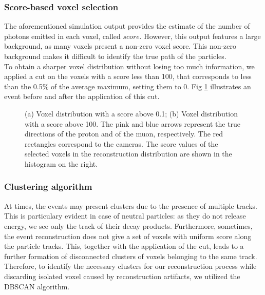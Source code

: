\subsubsection{Score-based voxel selection}
The aforementioned simulation output provides the estimate of the number of photons emitted in each voxel, called $score$. However, this output features a large background, as many voxels present a non-zero voxel score.
This non-zero background makes it difficult to identify the true path of the particles. \\ To obtain a sharper voxel distribution without losing too much information, we applied a cut on the voxels with a score less than 100, that corresponds to less than the 0.5\% of the average maximum, setting them to 0.
Fig \ref{fig:ev-cut} illustrates an event before and after the application of this cut.

\begin{figure}
    \centering
    \caption{(a) Voxel distribution with a score above 0.1; (b) Voxel distribution with a score above 100. The pink and blue arrows represent the true directions of the proton and of the muon, respectively. The red rectangles correspond to the cameras. The score values of the selected voxels in the reconstruction distribution are shown in the histogram on the right.}
    \label{fig:ev-cut}
\end{figure}

\subsubsection{Clustering algorithm}
At times, the events may present clusters due to the presence of multiple tracks. This is particulary evident in case of neutral particles: as they do not release energy, we see only the track of their decay products.
Furthermore, sometimes, the event reconstruction does not give a set of voxels with uniform score along the particle tracks. This, together with the application of the cut, leads to a further formation of disconnected clusters of voxels belonging to the same track. Therefore, to identify the necessary clusters for our reconstruction process while discarding isolated voxel caused by reconstruction artifacts, we utilized the DBSCAN algorithm.

